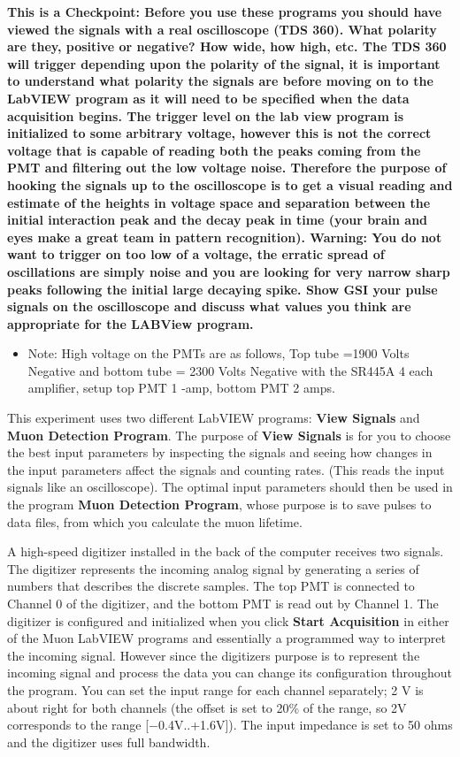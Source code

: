 \documentclass{../lab}
\begin{document}
\textbf{This is a Checkpoint: Before you use these programs you should have viewed the signals with a real oscilloscope (TDS 360). What polarity are they, positive or negative? How wide, how high, etc. The TDS 360 will trigger depending upon the polarity of the signal, it is important to understand what polarity the signals are before moving on to the LabVIEW program as it will need to be specified when the data acquisition begins. The trigger level on the lab view program is initialized to some arbitrary voltage, however this is not the correct voltage that is capable of reading both the peaks coming from the PMT and filtering out the low voltage noise. Therefore the purpose of hooking the signals up to the oscilloscope is to get a visual reading and estimate of the heights in voltage space and separation between the initial interaction peak and the decay peak in time (your brain and eyes make a great team in pattern recognition). Warning: You do not want to trigger on too low of a voltage, the erratic spread of oscillations are simply noise and you are looking for very narrow sharp peaks following the initial large decaying spike. Show  GSI your pulse signals on the oscilloscope and discuss what values you think are appropriate for the LABView program. }
\begin{itemize}
    \item Note: High voltage on the PMTs are as follows, Top tube =1900 Volts Negative and bottom tube = 2300 Volts Negative with the SR445A 4 each amplifier, setup top PMT 1 -amp, bottom PMT 2 amps.

\end{itemize}

This experiment uses two different LabVIEW programs: \textbf{View Signals} and \textbf{Muon Detection Program}. The purpose of \textbf{View Signals} is for you to choose the best input parameters by inspecting the signals and seeing how changes in the input parameters affect the signals and counting rates. (This reads the input signals like an oscilloscope). The optimal input parameters should then be used in the program \textbf{Muon Detection Program}, whose purpose is to save pulses to data files, from which you calculate the muon lifetime.

A high-speed digitizer installed in the back of the computer receives two signals. The digitizer represents the incoming analog signal by generating a series of numbers that describes the discrete samples. The top PMT is connected to Channel 0 of the digitizer, and the bottom PMT is read out by Channel 1. The digitizer is configured and initialized when you click \textbf{Start Acquisition} in either of the Muon LabVIEW programs and essentially a programmed way to interpret the incoming signal. However since the digitizers purpose is to represent the incoming signal and process the data you can change its configuration throughout the program. You can set the input range for each channel separately; 2 V is about right for both channels (the offset is set to 20\% of the range, so 2V corresponds to the range [$-$0.4V..+1.6V]). The input impedance is set to 50 ohms and the digitizer uses full bandwidth.
\end{document}
